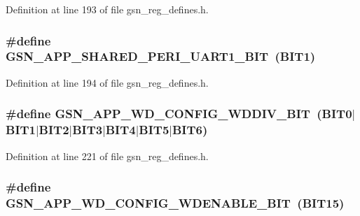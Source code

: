 Definition at line 193 of file gsn\_\-reg\_\-defines.h.

\hypertarget{a00546_a0f847bed02c1da6c9a7306cbaca98a81}{
\subsubsection[{GSN\_\-APP\_\-SHARED\_\-PERI\_\-UART1\_\-BIT}]{\setlength{\rightskip}{0pt plus 5cm}\#define GSN\_\-APP\_\-SHARED\_\-PERI\_\-UART1\_\-BIT~(BIT1)}}
\label{a00546_a0f847bed02c1da6c9a7306cbaca98a81}


Definition at line 194 of file gsn\_\-reg\_\-defines.h.

\hypertarget{a00546_a4c5de9dd616e4beaacb9217d444e1433}{
\subsubsection[{GSN\_\-APP\_\-WD\_\-CONFIG\_\-WDDIV\_\-BIT}]{\setlength{\rightskip}{0pt plus 5cm}\#define GSN\_\-APP\_\-WD\_\-CONFIG\_\-WDDIV\_\-BIT~(BIT0$|$BIT1$|$BIT2$|$BIT3$|$BIT4$|$BIT5$|$BIT6)}}
\label{a00546_a4c5de9dd616e4beaacb9217d444e1433}


Definition at line 221 of file gsn\_\-reg\_\-defines.h.

\hypertarget{a00546_a64457565ac402518d7b8c923a5b66911}{
\subsubsection[{GSN\_\-APP\_\-WD\_\-CONFIG\_\-WDENABLE\_\-BIT}]{\setlength{\rightskip}{0pt plus 5cm}\#define GSN\_\-APP\_\-WD\_\-CONFIG\_\-WDENABLE\_\-BIT~(BIT15)}}
\label{a00546_a64457565ac402518d7b8c923a5b66911}


